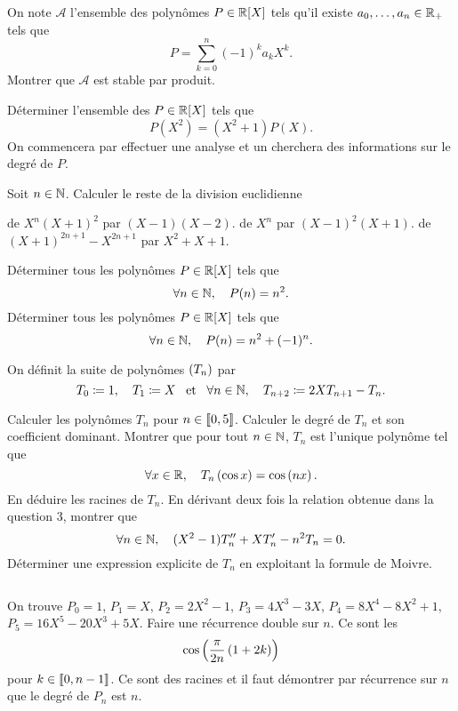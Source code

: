 \documentclass{magnolia}
\begin{document}




On note $\mathcal{A}$ l'ensemble des polynômes $P\in\polyR$ tels qu'il existe
$a_0,\ldots,a_n\in\mathbb{R}_+$ tels que
\[P=\sum_{k=0}^n (-1)^k a_k X^k.\]
Montrer que $\mathcal{A}$ est stable par produit.



Déterminer l'ensemble des $P\in\polyR$ tels que
\[P(X^2)=(X^2+1)P(X).\]
On commencera par effectuer une analyse et un cherchera des informations sur
le degré de $P$.


Soit $n\in\mathbb{N}$. Calculer le reste de la division euclidienne
\begin{questions}
\question de $X^n(X+1)^2$ par $(X-1)(X-2)$.
\question de $X^n$ par $(X-1)^2(X+1)$.
\question de $(X+1)^{2n+1} - X^{2n+1}$ par $X^2+X+1$.
\end{questions}


\begin{questions}
\question Déterminer tous les polynômes $P\in\polyR$ tels que
  \[\forall n\in\mathbb{N},\quad P(n)=n^2.\]
\question Déterminer tous les polynômes $P\in\polyR$ tels que
  \[\forall n\in\mathbb{N},\quad P(n)=n^2+(-1)^n.\]
\end{questions}


On définit la suite de polynômes $\left(T_n\right)$ par
\[T_0\coloneqq 1, \quad T_1\coloneqq X \quad\!\text{et}\quad\! \forall n\in\mathbb{N} ,\quad T_{n+2}\coloneqq 2XT_{n+1}-T_n.\]
\begin{questions}
\question Calculer les polynômes $T_n$ pour $n\in\left\llbracket 0,5\right\rrbracket$.
\question Calculer le degré de $T_n$ et son coefficient dominant.
\question Montrer que pour tout $n\in\mathbb{N}$, $T_n$ est l'unique polynôme
  tel que
  \[\forall x\in\mathbb{R} ,\quad T_n\left(\cos x\right)=\cos\left(nx\right).\]
\question En déduire les racines de $T_n$.
\question En dérivant deux fois la relation obtenue dans la question 3, montrer que
  \[\forall n\in\mathbb{N},\quad (X^2-1)T_n''+XT_n'-n^2T_n=0.\]
\question Déterminer une expression explicite de $T_n$ en exploitant la formule de
  Moivre.
\end{questions}
\begin{sol}
$\quad$
\begin{questions}
\question On trouve $P_0=1$, $P_1=X$, $P_2=2X^2-1$, $P_3=4X^3-3X$,
  $P_4=8X^4-8X^2+1$, $P_5=16X^5-20X^3+5X$.
\question Faire une récurrence double sur $n$.
\question Ce sont les
  \[\cos\left(\frac{\pi}{2n}\left(1+2k\right)\right)\]
  pour $k\in\left\llbracket 0,n-1\right\rrbracket$. Ce sont des racines et il faut démontrer par
  récurrence sur $n$ que le degré de $P_n$ est $n$.
\end{questions}
\end{sol}
\end{document}

